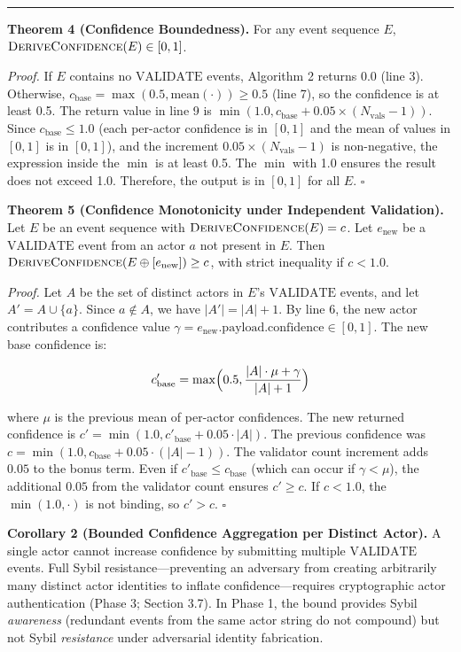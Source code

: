 \begin{center}\rule{0.5\linewidth}{0.5pt}\end{center}

\textbf{Theorem 4 (Confidence Boundedness).} For any event sequence \(E\), \(\textsc{DeriveConfidence}(E) \in [0, 1]\).

\emph{Proof.} If \(E\) contains no \(\text{VALIDATE}\) events, Algorithm 2 returns 0.0 (line 3). Otherwise, \(c_{\text{base}} = \max(0.5, \text{mean}(\cdot)) \geq 0.5\) (line 7), so the confidence is at least 0.5. The return value in line 9 is \(\min(1.0, c_{\text{base}} + 0.05 \times (N_{\text{vals}} - 1))\). Since \(c_{\text{base}} \leq 1.0\) (each per-actor confidence is in \([0, 1]\) and the mean of values in \([0, 1]\) is in \([0, 1]\)), and the increment \(0.05 \times (N_{\text{vals}} - 1)\) is non-negative, the expression inside the \(\min\) is at least 0.5. The \(\min\) with 1.0 ensures the result does not exceed 1.0. Therefore, the output is in \([0, 1]\) for all \(E\). \(\square\)

\textbf{Theorem 5 (Confidence Monotonicity under Independent Validation).} Let \(E\) be an event sequence with \(\textsc{DeriveConfidence}(E) = c\). Let \(e_{\text{new}}\) be a \(\text{VALIDATE}\) event from an actor \(a\) not present in \(E\). Then \(\textsc{DeriveConfidence}(E \oplus [e_{\text{new}}]) \geq c\), with strict inequality if \(c < 1.0\).

\emph{Proof.} Let \(A\) be the set of distinct actors in \(E\)'s \(\text{VALIDATE}\) events, and let \(A' = A \cup \{a\}\). Since \(a \notin A\), we have \(|A'| = |A| + 1\). By line 6, the new actor contributes a confidence value \(\gamma = e_{\text{new}}.\text{payload}.\text{confidence} \in [0, 1]\). The new base confidence is:

\[
c'_{\text{base}} = \max\Bigl(0.5, \frac{|A| \cdot \mu + \gamma}{|A| + 1}\Bigr)
\]

where \(\mu\) is the previous mean of per-actor confidences. The new returned confidence is \(c' = \min(1.0, c'_{\text{base}} + 0.05 \cdot |A|)\). The previous confidence was \(c = \min(1.0, c_{\text{base}} + 0.05 \cdot (|A| - 1))\). The validator count increment adds \(0.05\) to the bonus term. Even if \(c'_{\text{base}} \leq c_{\text{base}}\) (which can occur if \(\gamma < \mu\)), the additional \(0.05\) from the validator count ensures \(c' \geq c\). If \(c < 1.0\), the \(\min(1.0, \cdot)\) is not binding, so \(c' > c\). \(\square\)

\textbf{Corollary 2 (Bounded Confidence Aggregation per Distinct Actor).} A single actor cannot increase confidence by submitting multiple \(\text{VALIDATE}\) events. Full Sybil resistance---preventing an adversary from creating arbitrarily many distinct actor identities to inflate confidence---requires cryptographic actor authentication (Phase 3; Section 3.7). In Phase 1, the bound provides Sybil \emph{awareness} (redundant events from the same actor string do not compound) but not Sybil \emph{resistance} under adversarial identity fabrication.

